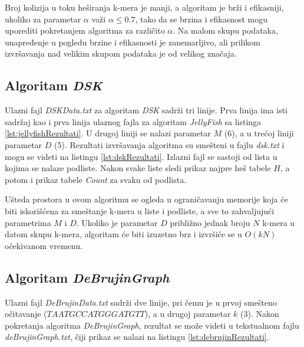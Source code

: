 \documentclass[12pt,oneside]{memoir}
\begin{document}


Broj kolizija u toku heširanja k-mera je manji, a algoritam je brži i efikasniji, ukoliko za parametar $\alpha$ važi $\alpha \leq 0.7$, tako da se brzina i efikasnost mogu uporediti pokretanjem algoritma za različito $\alpha$. Na malom skupu podataka, unapređenje u pogledu brzine i efikasnosti je zanemarljivo, ali prilikom izvršavanja nad velikim skupom podataka je od velikog značaja.

\subsection{Algoritam \textit{DSK}}

Ulazni fajl \textit{DSKData.txt} za algoritam \textit{DSK} sadrži tri linije. Prva linija ima isti sadržaj kao i prva linija ulaznog fajla za algoritam \textit{JellyFish} sa listinga \ref{lst:jellyfishRezultati}. U drugoj liniji se nalazi parametar $M$ (6), a u trećoj liniji parametar $D$ (5). Rezultati izvršavanja algoritma su smešteni u fajlu \textit{dsk.txt} i mogu se videti na listingu \ref{lst:dskRezultati}. Izlazni fajl se sastoji od lista u kojima se nalaze podliste. Nakon svake liste sledi prikaz najpre heš tabele $H$, a potom i prikaz tabele \textit{Count} za svaku od podlista.



Ušteda prostora u ovom algoritmu se ogleda u ograničavanju memorije koja će biti iskorišćena za smeštanje k-mera u liste i podliste, a sve to zahvaljujući parametrima $M$ i $D$. Ukoliko je parametar $D$ približno jednak broju $N$ k-mera u datom skupu k-mera, algoritam će biti izuzetno brz i izvršiće se u $O(kN)$ očekivanom vremenu.

\subsection{Algoritam \textit{DeBrujinGraph}}
\label{odeljak:debrujinRezultati}

Ulazni fajl \textit{DeBrujinData.txt} sadrži dve linije, pri čemu je u prvoj smešteno očitavanje ($TAATGCCATGGGATGTT$), a u drugoj parametar $k$ (3). Nakon pokretanja algoritma \textit{DeBrujinGraph}, rezultat se može videti u tekstualnom fajlu \textit{deBrujinGraph.txt}, čiji prikaz se nalazi na listingu \ref{lst:debrujinRezultati}.
\end{document}

